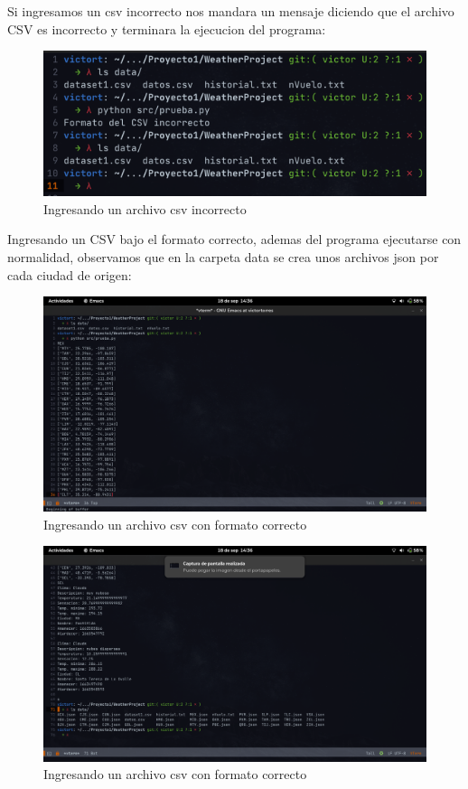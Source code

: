 \documentclass[12pt]{article}
\begin{document}
Si ingresamos un csv incorrecto nos mandara un mensaje diciendo que el archivo CSV es incorrecto y terminara la ejecucion del programa:\\
\begin{figure}[ht]
  \centering
  \includegraphics[scale=0.5]{figures/csvmalo}
  \caption{Ingresando un archivo csv incorrecto}
\end{figure}
\newpage
Ingresando un CSV bajo el formato correcto, ademas del programa ejecutarse con normalidad, observamos que en la carpeta data se crea unos archivos json por cada ciudad de origen:
\begin{figure}[ht]
  \centering
  \includegraphics[scale=0.2]{figures/csv1}
  \caption{Ingresando un archivo csv con formato correcto}
\end{figure}

\begin{figure}[ht]
  \centering
  \includegraphics[scale=0.2]{figures/csv2}
  \caption{Ingresando un archivo csv con formato correcto}
\end{figure}
\newpage
\end{document}
